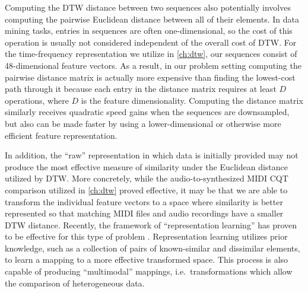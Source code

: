 Computing the DTW distance between two sequences also potentially involves computing the pairwise Euclidean distance between all of their elements.
In data mining tasks, entries in sequences are often one-dimensional, so the cost of this operation is usually not considered independent of the overall cost of DTW.
For the time-frequency representation we utilize in \cref{ch:dtw}, our sequences consist of 48-dimensional feature vectors.
As a result, in our problem setting computing the pairwise distance matrix is actually more expensive than finding the lowest-cost path through it because each entry in the distance matrix requires at least $D$ operations, where $D$ is the feature dimensionality.
Computing the distance matrix similarly receives quadratic speed gains when the sequences are downsampled, but also can be made faster by using a lower-dimensional or otherwise more efficient feature representation.

In addition, the ``raw'' representation in which data is initially provided may not produce the most effective measure of similarity under the Euclidean distance utilized by DTW.
More concretely, while the audio-to-synthesized MIDI CQT comparison utilized in \cref{ch:dtw} proved effective, it may be that we are able to transform the individual feature vectors to a space where similarity is better represented so that matching MIDI files and audio recordings have a smaller DTW distance.
Recently, the framework of ``representation learning'' has proven to be effective for this type of problem \cite{bengio2013representation}.
Representation learning utilizes prior knowledge, such as a collection of pairs of known-similar and dissimilar elements, to learn a mapping to a more effective transformed space.
This process is also capable of producing ``multimodal'' mappings, i.e.\ transformations which allow the comparison of heterogeneous data.

